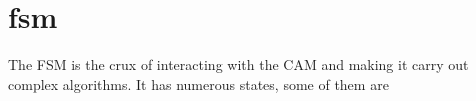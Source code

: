 \section{fsm}
The FSM is the crux of interacting with the CAM and making it carry out complex algorithms. It has numerous states, some of them are 